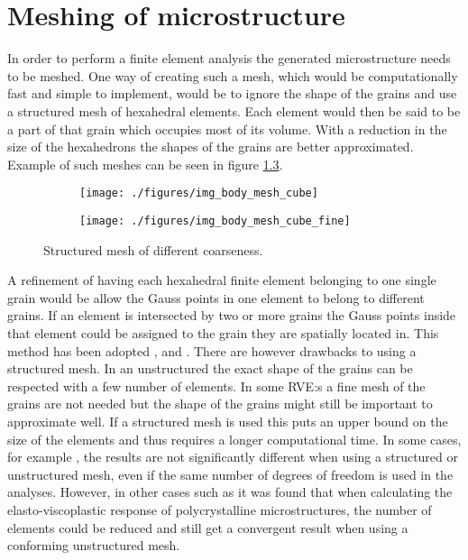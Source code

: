 \documentclass[meshing_micro.tex]{subfiles}
\begin{document}
\FloatBarrier

\chapter{Meshing of microstructure}

In order to perform a finite element analysis the generated microstructure needs to be meshed. One way of creating such a mesh, which would be computationally fast and simple to implement, would be to ignore the shape of the grains and use a structured mesh of hexahedral elements. Each element would then be said to be a part of that grain which occupies most of its volume. With a reduction in the size of the hexahedrons the shapes of the grains are better approximated. Example of such meshes can be seen in figure \ref{fig:pois_voronoi_mesh_cube}.

\begin{figure}[htpb!]
\centering
\begin{subfigure}[b]{.5\textwidth}
  \centering
  \texttt{[image: ./figures/img\_body\_mesh\_cube]}
  \caption{}
  \label{fig:pois_voronoi_mesh_cube_a}
\end{subfigure}%
\begin{subfigure}[b]{.5\textwidth}
  \centering
  \texttt{[image: ./figures/img\_body\_mesh\_cube\_fine]}
  \caption{}
  \label{fig:pois_voronoi_mesh_cube_b}
\end{subfigure}
\caption{Structured mesh of different coarseness.}
\label{fig:pois_voronoi_mesh_cube}
\end{figure}

A refinement of having each hexahedral finite element belonging to one single grain would be allow the Gauss points in one element to belong to different grains. 
If an element is intersected by two or more grains the Gauss points inside that element could be assigned to the grain they are spatially located in. 
This method has been adopted \cite{Nygards20031049}, \cite{Cailletaud2003351} and \cite{Barbe2001513}. There are however drawbacks to using a structured mesh. 
In an unstructured the exact shape of the grains can be respected with a few number of elements. In some RVE:s a fine mesh of the grains are not needed but the shape of the grains might still be important to approximate well. If a structured mesh is used this puts an upper bound on the size of the elements and thus requires a longer computational time.
In some cases, for example \cite{Bohlke201011}, the results are not significantly different when using a structured or unstructured mesh, even if the same number of degrees of freedom is used in the analyses. However, in other cases such as \cite{Li20091163} it was found that when calculating the elasto-viscoplastic response of polycrystalline microstructures, the number of elements could be reduced and still get a convergent result when using a conforming unstructured mesh. 
\end{document}
